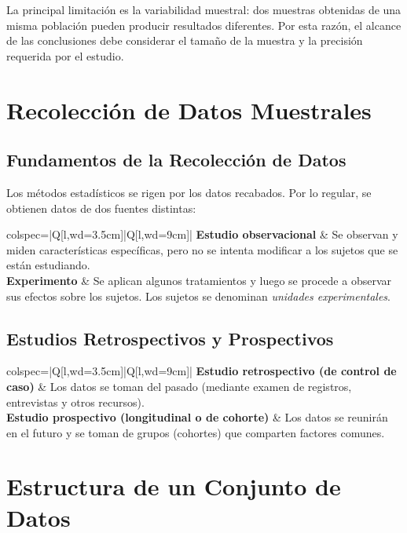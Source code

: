 La principal limitación es la variabilidad muestral: dos muestras obtenidas de una misma población pueden producir resultados diferentes. Por esta razón, el alcance de las conclusiones debe considerar el tamaño de la muestra y la precisión requerida por el estudio.

\section{Recolección de Datos Muestrales}

\subsection{Fundamentos de la Recolección de Datos}

Los métodos estadísticos se rigen por los datos recabados. Por lo regular, se obtienen datos de dos fuentes distintas:

\begin{longtblr}{colspec={|Q[l,wd=3.5cm]|Q[l,wd=9cm]|}}
\hline
\textbf{Estudio observacional} & Se observan y miden características específicas, pero no se intenta modificar a los sujetos que se están estudiando. \\
\hline
\textbf{Experimento} & Se aplican algunos tratamientos y luego se procede a observar sus efectos sobre los sujetos. Los sujetos se denominan \textit{unidades experimentales}. \\
\hline
\end{longtblr}

\subsection{Estudios Retrospectivos y Prospectivos}

\begin{longtblr}{colspec={|Q[l,wd=3.5cm]|Q[l,wd=9cm]|}}
\hline
\textbf{Estudio retrospectivo (de control de caso)} & Los datos se toman del pasado (mediante examen de registros, entrevistas y otros recursos). \\
\hline
\textbf{Estudio prospectivo (longitudinal o de cohorte)} & Los datos se reunirán en el futuro y se toman de grupos (cohortes) que comparten factores comunes. \\
\hline
\end{longtblr}

\section{Estructura de un Conjunto de Datos}

